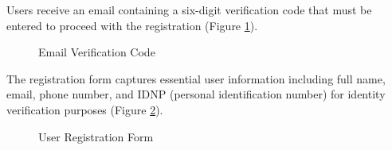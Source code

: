 Users receive an email containing a six-digit verification code that must be entered to proceed with the registration (Figure \ref{registration-email}).

\begin{figure}[H]
    \centering
    \caption{Email Verification Code}
    \label{registration-email}
\end{figure}

The registration form captures essential user information including full name, email, phone number, and IDNP (personal identification number) for identity verification purposes (Figure \ref{registration-form}).

\begin{figure}[H]
    \centering
    \caption{User Registration Form}
    \label{registration-form}
\end{figure}

